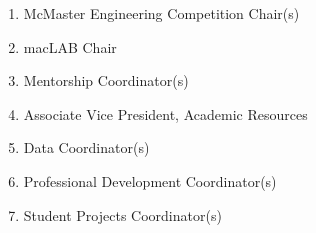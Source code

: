 \begin{enumerate}
  \begin{enumerate}
   \item
    McMaster Engineering Competition Chair(s)
   \item
    macLAB Chair
   \item
    Mentorship Coordinator(s)
   \item
    Associate Vice President, Academic Resources
   \item
    Data Coordinator(s)
   \item
    Professional Development Coordinator(s)
   \item
    Student Projects Coordinator(s)

  \end{enumerate}
\end{enumerate}